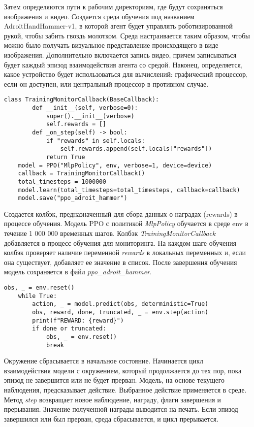 Затем определяются пути к рабочим директориям, где будут сохраняться изображения и видео. 
Создается среда обучения под названием AdroitHandHammer-v1, 
в которой агент будет управлять роботизированной рукой, чтобы забить гвоздь молотком. 
Среда настраивается таким образом, чтобы можно было получать визуальное представление происходящего в виде изображения.
Дополнительно включается запись видео, причем записываться будет каждый эпизод взаимодействия агента со средой.
Наконец, определяется, какое устройство будет использоваться для вычислений: графический процессор, если он доступен, или центральный процессор в противном случае.

\begin{lstlisting}[label=init, caption={Обучение модели и настройки колбэка}]
    class TrainingMonitorCallback(BaseCallback):
        def __init__(self, verbose=0):
            super().__init__(verbose)
            self.rewards = []
        def _on_step(self) -> bool:
            if "rewards" in self.locals:
                self.rewards.append(self.locals["rewards"])
            return True
    model = PPO("MlpPolicy", env, verbose=1, device=device)
    callback = TrainingMonitorCallback()
    total_timesteps = 1000000
    model.learn(total_timesteps=total_timesteps, callback=callback)
    model.save("ppo_adroit_hammer")
\end{lstlisting}
Создается колбэк, предназначенный для сбора данных о наградах (rewards) в процессе обучения.
Модель PPO с политикой \textit{MlpPolicy} обучается в среде env в течение 1 000 000 временных шагов. 
Колбэк \textit{TrainingMonitorCallback} добавляется в процесс обучения для мониторинга.
На каждом шаге обучения колбэк проверяет наличие переменной \textit{rewards} в локальных переменных и, 
если она существует, добавляет ее значение в список.
После завершения обучения модель сохраняется в файл \textit{ppo\_adroit\_hammer}. 

\begin{lstlisting}[label=init, caption={Тестирование}]
    obs, _ = env.reset()
    while True:
        action, _ = model.predict(obs, deterministic=True)
        obs, reward, done, truncated, _ = env.step(action)
        print(f"REWARD: {reward}")
        if done or truncated:
            obs, _ = env.reset()
            break
\end{lstlisting}
Окружение сбрасывается в начальное состояние.
Начинается цикл взаимодействия модели с окружением, который продолжается до тех пор, 
пока эпизод не завершится или не будет прерван.
Модель, на основе текущего наблюдения, предсказывает действие. 
Выбранное действие применяется в среде. 
Метод \textit{step} возвращает новое наблюдение, награду, флаги завершения и прерывания.
Значение полученной награды выводится на печать.
Если эпизод завершился или был прерван, среда сбрасывается, и цикл прерывается.

